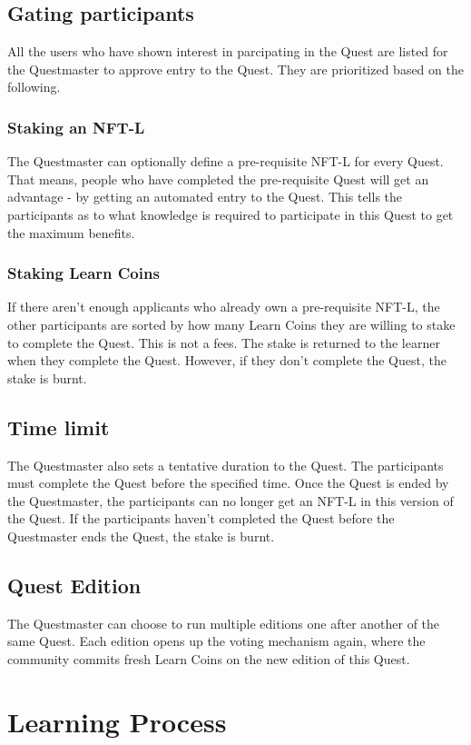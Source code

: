 \documentclass{article}
\begin{document}
    \subsection{Gating participants}
      All the users who have shown interest in parcipating in the Quest are listed for the Questmaster to approve entry to the Quest. They are prioritized based on the following.
      \subsubsection{Staking an NFT-L}
        The Questmaster can optionally define a pre-requisite NFT-L for every Quest. That means, people who have completed the pre-requisite Quest will get an advantage - by getting an automated entry to the Quest.
        This tells the participants as to what knowledge is required to participate in this Quest to get the maximum benefits. 
      \subsubsection{Staking Learn Coins}
        If there aren't enough applicants who already own a pre-requisite NFT-L, the other participants are sorted by how many Learn Coins they are willing to stake to complete the Quest. This is not a fees. The stake is returned to the learner when they complete the Quest. However, if they don't complete the Quest, the stake is burnt.
    \subsection{Time limit}
      The Questmaster also sets a tentative duration to the Quest. The participants must complete the Quest before the specified time. 
      Once the Quest is ended by the Questmaster, the participants can no longer get an NFT-L in this version of the Quest. If the participants haven't completed the Quest before the Questmaster ends the Quest, the stake is burnt.
    \subsection{Quest Edition}
      The Questmaster can choose to run multiple editions one after another of the same Quest. Each edition opens up the voting mechanism again, where the community commits fresh Learn Coins on the new edition of this Quest. 
  \section{Learning Process}
\end{document}
